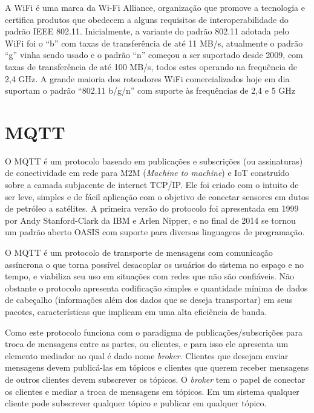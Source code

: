 A \acf{WiFi} é uma marca da Wi-Fi Alliance, organização que promove a tecnologia e certifica produtos que obedecem a alguns requisitos de interoperabilidade do padrão \ac{IEEE} 802.11. Inicialmente, a variante do padrão 802.11 adotada pelo WiFi foi o ``b'' com taxas de transferência de até 11 MB/s, atualmente o padrão ``g'' vinha sendo usado e o padrão ``n'' começou a ser suportado desde 2009, com taxas de transferência de até 100 MB/s, todos estes operando na frequência de 2,4 GHz. A grande maioria dos roteadores WiFi comercializados hoje em dia suportam o padrão ``802.11 b/g/n'' com suporte às frequências de 2,4 e 5 GHz 

\section{\ac{MQTT}}

O \acf{MQTT} é um protocolo baseado em publicações e subscrições (ou assinaturas) de conectividade em rede para M2M (\textit{Machine to machine}) e \ac{IoT} construído sobre a camada subjacente de internet \ac{TCP}/\ac{IP}. Ele foi criado com o intuito de ser leve, simples e de fácil aplicação com o objetivo de conectar sensores em dutos de petróleo a satélites. A primeira versão do protocolo foi apresentada em 1999 por Andy Stanford-Clark da IBM e Arlen Nipper, e no final de 2014 se tornou um padrão aberto OASIS \cite{oasis} com suporte para diversas linguagens de programação.

O MQTT é um protocolo de transporte de mensagens com comunicação assíncrona o que torna possível desacoplar os usuários do sistema no espaço e no tempo, e viabiliza seu uso em situações com redes que não são confiáveis. Não obstante o protocolo apresenta codificação simples e quantidade mínima de dados de cabeçalho (informações além dos dados que se deseja transportar) em seus pacotes, características que implicam em uma alta eficiência de banda.

Como este protocolo funciona com o paradigma de publicações/subscrições para troca de mensagens entre as partes, ou clientes, e para isso ele apresenta um elemento mediador ao qual é dado nome \textit{broker}. Clientes que desejam enviar mensagens devem publicá-las em tópicos e clientes que querem receber mensagens de outros clientes devem subscrever os tópicos. O \textit{broker} tem o papel de conectar os clientes e mediar a troca de mensagens em tópicos. Em um sistema qualquer cliente pode subscrever qualquer tópico e publicar em qualquer tópico.

